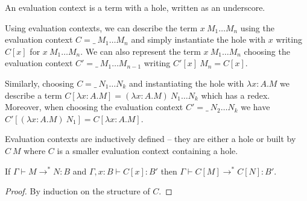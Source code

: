 \documentclass{article}
\newcommand{\mred}{\longrightarrow^*}
\newcommand{\red}{\longrightarrow}
\begin{document}
An evaluation context is a term with a hole, written as an underscore.

Using evaluation contexts, we can describe the term $x~M_1 \ldots M_n$ using the evaluation context $C = \_~M_1 \ldots M_n$ and simply instantiate the hole with $x$ writing $C[x]$ for $x~M_1 \ldots M_n$. We can also represent the term $x~M_1 \ldots M_n$ choosing the evaluation context $C' = \_~M_1 \ldots M_{n-1}$ writing $C'[x]~M_n = C[x]$.

Similarly, choosing $C = \_ ~N_1 \ldots N_k$ and instantiating the hole with $\lambda x{:}A.M$ we describe a term $C[\lambda x{:}A.M] = (\lambda x{:}A.M)~N_1 \ldots N_k$ which has a redex. Moreover, when choosing the evaluation context $C' = \_~N_2 \ldots N_k$ we have $C'[(\lambda x{:}A.M)~N_1] = C[\lambda x{:}A.M]$.





Evaluation contexts are inductively defined -- they are either a hole or built by $C~M$ where $C$ is a smaller evaluation context containing a hole.

\begin{lemma}\label{lm:mredecxt}
If $\Gamma \vdash M \mred N : B$ and $\Gamma, x{:}B \vdash C[x] : B'$
then $\Gamma \vdash C[M] \mred C[N] : B'$.  
\end{lemma}
\begin{proof}
By induction on the structure of $C$.  
\end{proof}
\end{document}
